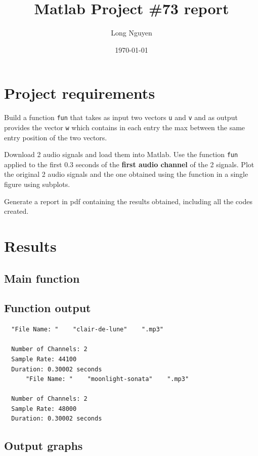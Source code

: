 \documentclass[a4paper,12pt]{article}
\title{Matlab Project \#73 report}
\date{\today}
\author{Long Nguyen}
\begin{document}
\maketitle

\section{Project requirements}

Build a function \verb|fun| that takes as input two vectors \verb|u| and \verb|v|
and as output provides the vector \verb|w| which contains in each entry
the max between the same entry position of the two vectors.

Download 2 audio signals and load them into Matlab.
Use the function \verb|fun| applied to the first 0.3 seconds of the
\textbf{first audio channel} of the 2 signals.
Plot the original 2 audio signals and the one obtained using the
function in a single figure using subplots.

Generate a report in pdf containing the results obtained,
including all the codes created.

\section{Results}

\subsection*{Main function}


\subsection*{Function output}
\begin{verbatim}
  "File Name: "    "clair-de-lune"    ".mp3"

  Number of Channels: 2
  Sample Rate: 44100
  Duration: 0.30002 seconds
      "File Name: "    "moonlight-sonata"    ".mp3"
  
  Number of Channels: 2
  Sample Rate: 48000
  Duration: 0.30002 seconds
\end{verbatim}

\subsection*{Output graphs}
\end{document}
